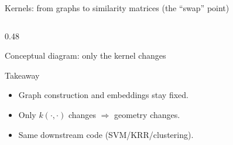 \documentclass[aspectratio=169,xcolor={dvipsnames}]{beamer}
\begin{document}
\begin{frame}[shrink=30]{Kernels: from graphs to similarity matrices (the “swap” point)}
\begin{columns}[T,onlytextwidth]
\begin{column}{0.48\textwidth}
\begin{block}{Conceptual diagram: only the kernel changes}
    \end{block}

    \vspace{1mm}
    \begin{block}{Takeaway}
    \footnotesize
    \begin{itemize}\setlength\itemsep{2pt}
    \item Graph construction and embeddings stay fixed.
    \item Only $k(\cdot,\cdot)$ changes $\Rightarrow$ geometry changes.
    \item Same downstream code (SVM/KRR/clustering).
    \end{itemize}
    \end{block}
    \end{column}
    \end{columns}
\end{frame}
\end{document}
